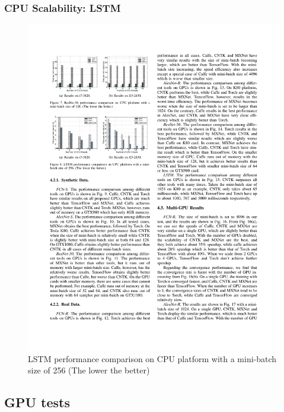 \begin{frame}
	\MyLogo
	\frametitle{CPU Scalability: LSTM}  
	\begin{figure}[htbp] 
		\includegraphics[width=\linewidth]{figures/LSTM1.pdf} 
		\caption{LSTM performance comparison on CPU platform with a mini-batch size of 256 (The lower the better)}
	\end{figure}
\end{frame}

\subsection{GPU tests}

